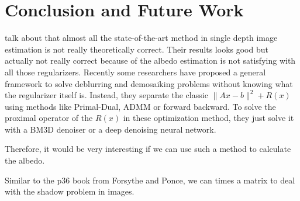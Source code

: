 \chapter{Conclusion and Future Work} \label{chap:conclusion}

talk about that almost all the state-of-the-art method in single depth image estimation is not really theoretically correct. Their results looks good but actually not really correct because of the albedo estimation is not satisfying with all those regularizers.
Recently some researchers have proposed a general framework to solve deblurring and demosaiking problems without knowing what the regularizer itself is.
Instead, they separate the classic $\lVert Ax - b\rVert^2 + R(x)$ using methods like Primal-Dual, ADMM or forward backward. To solve the proximal operator of the $R(x)$ in these optimization method, they just solve it with a BM3D denoiser\cite{heide2014flexisp} or a deep denoising neural network\cite{meinhardt2017learning}.

Therefore, it would be very interesting if we can use such a method to calculate the albedo. 


Similar to the p36 book from Forsythe and Ponce, we can times a matrix to deal with the shadow problem in images. 